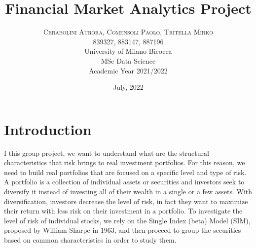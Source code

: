 \documentclass[twocolumn]{article}
\title{\textbf{Financial Market Analytics Project}}
\author{%
\textsc{Cerabolini Aurora, Comensoli Paolo, Tritella Mirko}\\[1ex] 
\textsc{839327, 883147, 887196}\\[1ex] 
\normalsize University of Milano Bicocca \\ 
\normalsize MSc Data Science \\ %
\normalsize Academic Year 2021/2022 \\ 
}
\date{July, 2022}
\begin{document}
\maketitle
\section{Introduction}

\lettrine[nindent=0em,lines=3]{I} this group project, we want to understand what are the structural characteristics that risk brings to real investment portfolios. For this reason, we need to build real portfolios that are focused on a specific level and type of risk. A portfolio is a collection of individual assets or securities and investors seek to diversify it instead of investing all of their wealth in a single or a few assets. With diversification, investors decrease the level of risk, in fact they want to maximize their return with less risk on their investment in a portfolio. To investigate the level of risk of individual stocks, we rely on the Single Index (beta) Model (SIM), proposed by William Sharpe in 1963, and then proceed to group the securities based on common characteristics in order to study them.
\end{document}
